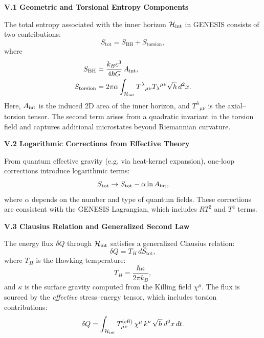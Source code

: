 \documentclass{article}
\begin{document}
\vspace{1em}
\noindent\textbf{V.1 Geometric and Torsional Entropy Components}

The total entropy associated with the inner horizon $\mathcal H_{\rm int}$ in GENESIS consists of two contributions:
\begin{equation}
S_{\mathrm{tot}} = S_{\mathrm{BH}} + S_{\mathrm{torsion}},
\end{equation}
where
\begin{align}
S_{\mathrm{BH}} &= \frac{k_B c^3}{4 \hbar G} \, A_{\rm int}, \\
S_{\mathrm{torsion}} &= 2\pi \alpha \int_{\mathcal H_{\rm int}} T^{\lambda}{}_{\mu\nu} T_{\lambda}{}^{\mu\nu} \sqrt{h} \, d^2x.
\end{align}
Here, $A_{\rm int}$ is the induced 2D area of the inner horizon, and $T^{\lambda}{}_{\mu\nu}$ is the axial–torsion tensor. The second term arises from a quadratic invariant in the torsion field and captures additional microstates beyond Riemannian curvature.

\vspace{1em}
\noindent\textbf{V.2 Logarithmic Corrections from Effective Theory}

From quantum effective gravity (e.g. via heat-kernel expansion), one-loop corrections introduce logarithmic terms:
\begin{equation}
S_{\mathrm{tot}} \rightarrow S_{\mathrm{tot}} - \alpha \ln A_{\rm int},
\end{equation}
where $\alpha$ depends on the number and type of quantum fields. These corrections are consistent with the GENESIS Lagrangian, which includes $RT^2$ and $T^4$ terms.

\vspace{1em}
\noindent\textbf{V.3 Clausius Relation and Generalized Second Law}

The energy flux $\delta Q$ through $\mathcal H_{\rm int}$ satisfies a generalized Clausius relation:
\begin{equation}
\delta Q = T_H \, dS_{\mathrm{tot}},
\end{equation}
where $T_H$ is the Hawking temperature:
\begin{equation}
T_H = \frac{\hbar \kappa}{2\pi k_B},
\end{equation}
and $\kappa$ is the surface gravity computed from the Killing field $\chi^\mu$. The flux is sourced by the \emph{effective} stress–energy tensor, which includes torsion contributions:
\begin{equation}
\delta Q = \int_{\mathcal H_{\rm int}} T^{(\mathrm{eff})}_{\mu\nu} \, \chi^\mu \, k^\nu \, \sqrt{h} \, d^2x \, dt.
\end{equation}
\end{document}
